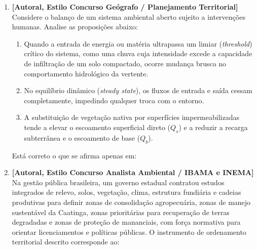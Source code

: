 \begin{enumerate}[leftmargin=1.8em, itemsep=5pt, resume]
  \item \textbf{[Autoral, Estilo Concurso Geógrafo / Planejamento Territorial]} Considere o balanço de um sistema ambiental aberto sujeito a intervenções humanas. Analise as proposições abaixo:
  \begin{enumerate}[label=\Roman*., leftmargin=2.0em, itemsep=2pt]
    \item Quando a entrada de energia ou matéria ultrapassa um limiar (\textit{threshold}) crítico do sistema, como uma chuva cuja intensidade excede a capacidade de infiltração de um solo compactado, ocorre mudança brusca no comportamento hidrológico da vertente.
    \item No equilíbrio dinâmico (\textit{steady state}), os fluxos de entrada e saída cessam completamente, impedindo qualquer troca com o entorno.
    \item A substituição de vegetação nativa por superfícies impermeabilizadas tende a elevar o escoamento superficial direto ($Q_s$) e a reduzir a recarga subterrânea e o escoamento de base ($Q_b$).
  \end{enumerate}
  Está correto o que se afirma apenas em:
  \espacoResolucao[1.2cm]

  \item \textbf{[Autoral, Estilo Concurso Analista Ambiental / IBAMA e INEMA]} Na gestão pública brasileira, um governo estadual contratou estudos integrados de relevo, solos, vegetação, clima, estrutura fundiária e cadeias produtivas para definir zonas de consolidação agropecuária, zonas de manejo sustentável da Caatinga, zonas prioritárias para recuperação de terras degradadas e zonas de proteção de mananciais, com força normativa para orientar licenciamentos e políticas públicas. O instrumento de ordenamento territorial descrito corresponde ao:
  \espacoResolucao[1.2cm]
\end{enumerate}

